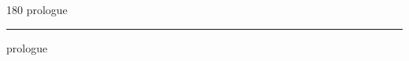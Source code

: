 
\begin{frame}
\begin{center}
\begin{turn}{180}
{\fontsize{2.5cm}{1em}\selectfont prologue}
\end{turn}
\vspace{1em}\par  
\hrule
\vspace{1em}\par  
{\fontsize{2.5cm}{1em}\selectfont prologue}
\end{center}
\end{frame}

